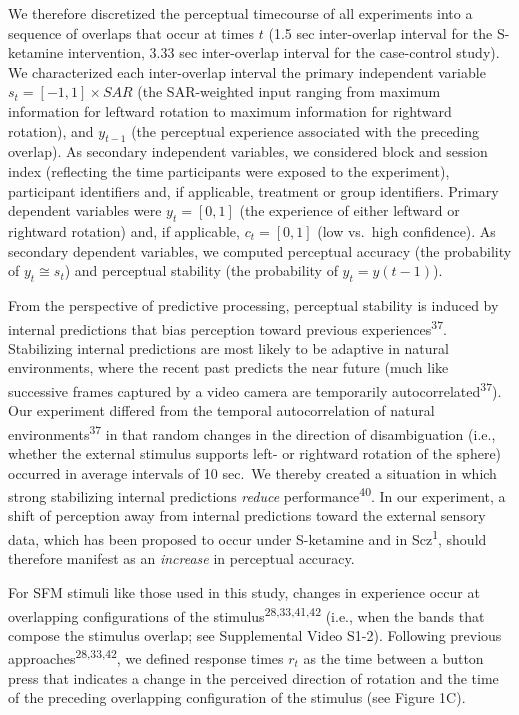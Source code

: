 \documentclass[
]{article}
\begin{document}
We therefore discretized the perceptual timecourse of all experiments
into a sequence of overlaps that occur at times \(t\) (1.5 sec
inter-overlap interval for the S-ketamine intervention, 3.33 sec
inter-overlap interval for the case-control study). We characterized
each inter-overlap interval the primary independent variable
\(s_t = [-1, 1] \times SAR\) (the SAR-weighted input ranging from
maximum information for leftward rotation to maximum information for
rightward rotation), and \(y_{t-1}\) (the perceptual experience
associated with the preceding overlap). As secondary independent
variables, we considered block and session index (reflecting the time
participants were exposed to the experiment), participant identifiers
and, if applicable, treatment or group identifiers. Primary dependent
variables were \(y_t = [0,1]\) (the experience of either leftward or
rightward rotation) and, if applicable, \(c_t = [0,1]\) (low vs.~high
confidence). As secondary dependent variables, we computed perceptual
accuracy (the probability of \(y_t \cong s_t\)) and perceptual stability
(the probability of \(y_t = y(t - 1)\)).

From the perspective of predictive processing, perceptual stability is
induced by internal predictions that bias perception toward previous
experiences\textsuperscript{37}. Stabilizing internal predictions are
most likely to be adaptive in natural environments, where the recent
past predicts the near future (much like successive frames captured by a
video camera are temporarily autocorrelated\textsuperscript{37}). Our
experiment differed from the temporal autocorrelation of natural
environments\textsuperscript{37} in that random changes in the direction
of disambiguation (i.e., whether the external stimulus supports left- or
rightward rotation of the sphere) occurred in average intervals of 10
sec.~We thereby created a situation in which strong stabilizing internal
predictions \emph{reduce} performance\textsuperscript{40}. In our
experiment, a shift of perception away from internal predictions toward
the external sensory data, which has been proposed to occur under
S-ketamine and in Scz\textsuperscript{1}, should therefore manifest as
an \emph{increase} in perceptual accuracy.

For SFM stimuli like those used in this study, changes in experience
occur at overlapping configurations of the
stimulus\textsuperscript{28,33,41,42} (i.e., when the bands that compose
the stimulus overlap; see Supplemental Video S1-2). Following previous
approaches\textsuperscript{28,33,42}, we defined response times \(r_t\)
as the time between a button press that indicates a change in the
perceived direction of rotation and the time of the preceding
overlapping configuration of the stimulus (see Figure 1C).
\end{document}
